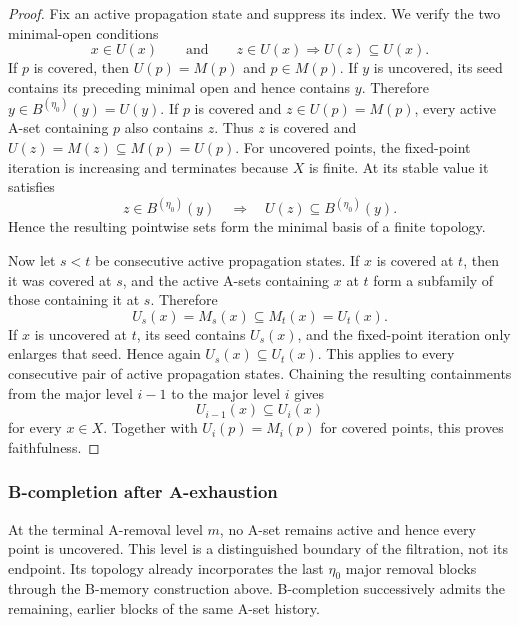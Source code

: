 \documentclass[a4paper,11pt]{article}
\theoremstyle{definition}
\theoremstyle{remark}
\begin{document}
\begin{proof}
Fix an active propagation state and suppress its index. We verify the two minimal-open conditions
$$
x\in U(x)
\qquad\text{and}\qquad
z\in U(x)\Longrightarrow U(z)\subseteq U(x).
$$
If $p$ is covered, then $U(p)=M(p)$ and $p\in M(p)$. If $y$ is uncovered, its seed contains its preceding minimal open and hence contains $y$. Therefore $y\in B^{(\eta_0)}(y)=U(y)$. If $p$ is covered and $z\in U(p)=M(p)$, every active A-set containing $p$ also contains $z$. Thus $z$ is covered and $U(z)=M(z)\subseteq M(p)=U(p)$. For uncovered points, the fixed-point iteration is increasing and terminates because $X$ is finite. At its stable value it satisfies
$$
z\in B^{(\eta_0)}(y)
\quad\Longrightarrow\quad
U(z)\subseteq B^{(\eta_0)}(y).
$$
Hence the resulting pointwise sets form the minimal basis of a finite topology. 

Now let $s<t$ be consecutive active propagation states. If $x$ is covered at $t$, then it was covered at $s$, and the active A-sets containing $x$ at $t$ form a subfamily of those containing it at $s$. Therefore
$$
U_s(x)=M_s(x)\subseteq M_t(x)=U_t(x).
$$
If $x$ is uncovered at $t$, its seed contains $U_s(x)$, and the fixed-point iteration only enlarges that seed. Hence again $U_s(x)\subseteq U_t(x)$. This applies to every consecutive pair of active propagation states. Chaining the resulting containments from the major level $i-1$ to the major level $i$ gives
$$
U_{i-1}(x)\subseteq U_i(x)
$$
for every $x\in X$. Together with $U_i(p)=M_i(p)$ for covered points, this proves faithfulness.
\end{proof}


\subsubsection*{B-completion after A-exhaustion}

At the terminal A-removal level $m$, no A-set remains active and hence every point is uncovered. This level is a distinguished boundary of the filtration, not its endpoint. Its topology already incorporates the last $\eta_0$ major removal blocks through the B-memory construction above. B-completion successively admits the remaining, earlier blocks of the same A-set history.
\end{document}
